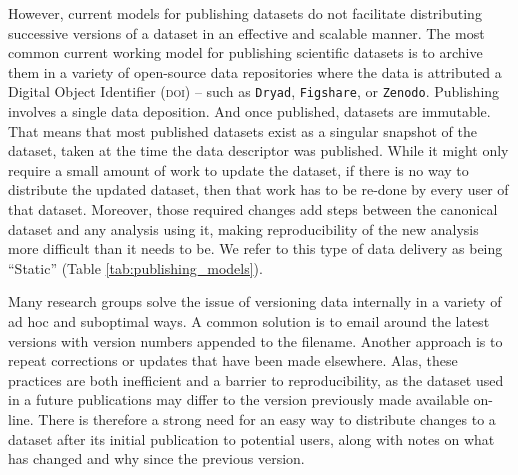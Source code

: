 \documentclass[a4paper,11pt]{article}
\begin{document}
However, current models for publishing datasets do not facilitate distributing successive versions of a dataset in an effective and scalable manner. The most common current working model for publishing scientific datasets is to archive them in a variety of open-source data repositories where the data is attributed a Digital Object Identifier (\textsc{doi}) -- such as \texttt{Dryad}, \texttt{Figshare}, or \texttt{Zenodo}. Publishing involves a single data deposition. And once published, datasets are immutable. That means that most published datasets exist as a singular snapshot of the dataset, taken at the time the data descriptor was published. While it might only require a small amount of work to update the dataset, if there is no way to distribute the updated dataset, then that work has to be re-done by every user of that dataset. Moreover, those required changes add steps between the canonical dataset and any analysis using it, making reproducibility of the new analysis more difficult than it needs to be. We refer to this type of data delivery as being ``Static'' (Table \ref{tab:publishing_models}).

Many research groups solve the issue of versioning data internally in a variety of ad hoc and suboptimal ways. A common solution is to email around the latest versions with version numbers appended to the filename. Another approach is to repeat corrections or updates that have been made elsewhere. Alas, these practices are both inefficient and a barrier to reproducibility, as the dataset used in a future publications may differ to the version previously made available on-line. There is therefore a strong need for an easy way to distribute changes to a dataset after its initial publication to potential users, along with notes on what has changed and why since the previous version.
\end{document}

